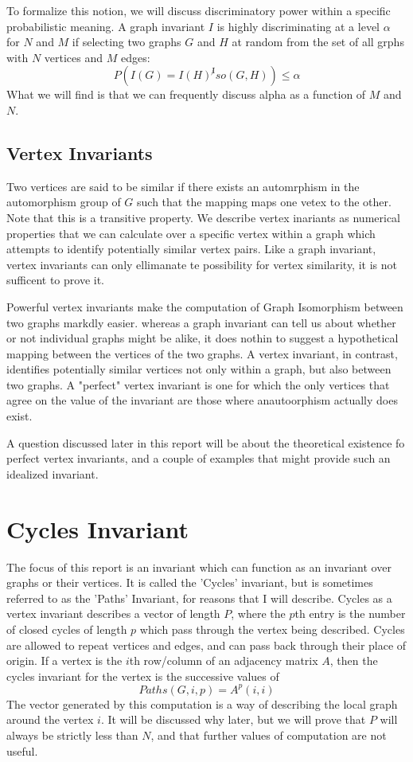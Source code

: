 \documentclass[11pt,a4paper]{report}
\begin{document}
To formalize this notion, we will discuss discriminatory power within a specific probabilistic meaning.
A graph invariant $I$ is highly discriminating at a level $\alpha$ for $N$ and $M$ if selecting two graphs $G$ and $H$ at random from the set of all grphs with $N$ vertices and $M$ edges:
$$P(I(G) = I(H) ^ \not Iso(G, H)) \leq \alpha$$
What we will find is that we can frequently discuss alpha as a function of $M$ and $N$. 

\subsection{Vertex Invariants}
Two vertices are said to be similar if there exists an automrphism in the automorphism group of $G$ such that the mapping maps one vetex to the other.
Note that this is a transitive property.
We describe vertex inariants as numerical properties that we can calculate over a specific vertex within a graph which attempts to identify potentially similar vertex pairs.
Like a graph invariant, vertex invariants can only ellimanate te possibility for vertex similarity, it is not sufficent to prove it. 

Powerful vertex invariants make the computation of Graph Isomorphism between two graphs markdly easier. 
whereas a graph invariant can tell us about whether or not individual graphs might be alike, it does nothin to suggest a hypothetical mapping between the vertices of the two graphs. 
A vertex invariant, in contrast, identifies potentially similar vertices not only within a graph, but also between two graphs.
A "perfect" vertex invariant is one for which the only vertices that agree on the value of the invariant are those where anautoorphism actually does exist.

A question discussed later in this report will be about the theoretical existence fo perfect vertex invariants, and a couple of examples that might provide such an idealized invariant.

\section{Cycles Invariant}
The focus of this report is an invariant which can function as an invariant over graphs or their vertices.
It is called the 'Cycles' invariant, but is sometimes referred to as the 'Paths' Invariant, for reasons that I will describe.
Cycles as a vertex invariant describes a vector of length $P$, where the $p$th entry is the number of closed cycles of length $p$ which pass through the vertex being described.
Cycles are allowed to repeat vertices and edges, and can pass back through their place of origin.
If a vertex is the $i$th row/column of an adjacency matrix $A$, then the cycles invariant for the vertex is the successive values of $$Paths(G, i, p) = A^p(i,i)$$
The vector generated by this computation is a way of describing the local graph around the vertex $i$.
It will be discussed why later, but we will prove that $P$ will always be strictly less than $N$, and that further values of computation are not useful.
\end{document}
